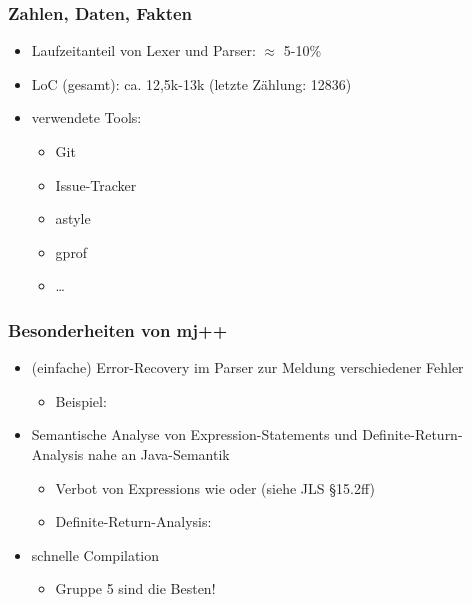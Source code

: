 \begin{frame}
	\frametitle{Zahlen, Daten, Fakten} %
	\begin{itemize}
		\item Laufzeitanteil von Lexer und Parser: $\approx$ 5-10\%	%
		\item LoC (gesamt): ca. 12,5k-13k (letzte Zählung: 12836)
		\item verwendete Tools: 
		\begin{itemize}
			\item Git
			\item Issue-Tracker
			\item astyle
			\item gprof
			\item \dots
		\end{itemize}
	\end{itemize}
\end{frame}

\begin{frame}
    \frametitle{Besonderheiten von mj++}
    \begin{itemize}
        \item (einfache) Error-Recovery im Parser zur Meldung verschiedener Fehler
        \begin{itemize}
        	\item Beispiel: 
        \end{itemize} \pause
        \item Semantische Analyse von Expression-Statements und Definite-Return-Analysis nahe an Java-Semantik
        \begin{itemize}
        	\item Verbot von Expressions wie  oder  (siehe JLS §15.2ff)
        	\item Definite-Return-Analysis: 
        \end{itemize} \pause
        \item schnelle Compilation
            \pause
        \begin{itemize}
        \item Gruppe 5 sind die Besten!
        \end{itemize}
    \end{itemize}
\end{frame}